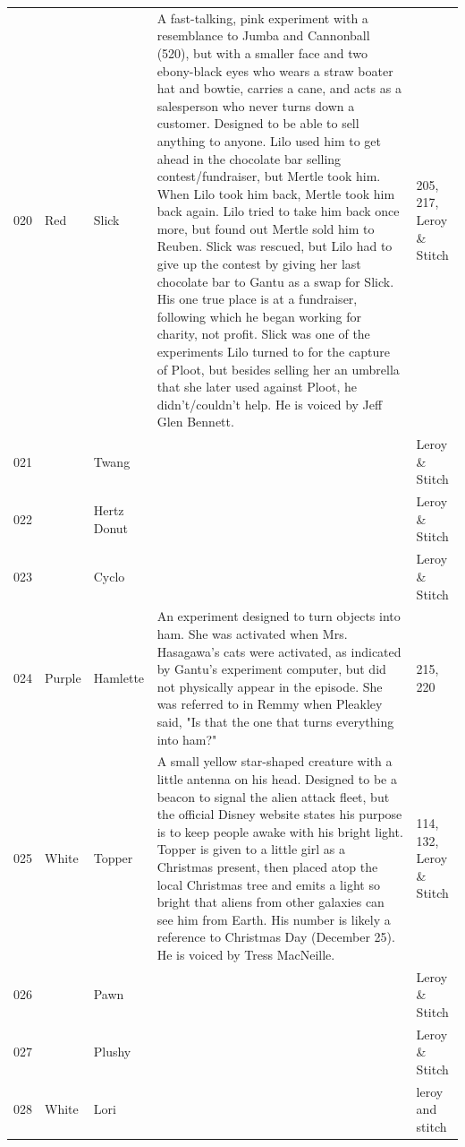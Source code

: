 \documentclass{article}
\begin{document}
\begin{tabular}{lllll}
020 & Red & Slick & A fast-talking, pink experiment with a resemblance to Jumba and Cannonball (520), but with a smaller face and two ebony-black eyes who wears a straw boater hat and bowtie, carries a cane, and acts as a salesperson who never turns down a customer. Designed to be able to sell anything to anyone. Lilo used him to get ahead in the chocolate bar selling contest/fundraiser, but Mertle took him. When Lilo took him back, Mertle took him back again. Lilo tried to take him back once more, but found out Mertle sold him to Reuben. Slick was rescued, but Lilo had to give up the contest by giving her last chocolate bar to Gantu as a swap for Slick. His one true place is at a fundraiser, following which he began working for charity, not profit. Slick was one of the experiments Lilo turned to for the capture of Ploot, but besides selling her an umbrella that she later used against Ploot, he didn't/couldn't help. He is voiced by Jeff Glen Bennett. & 205, 217, Leroy \& Stitch \\
021 &  & Twang &  & Leroy \& Stitch \\
022 &  & Hertz Donut &  & Leroy \& Stitch \\
023 &  & Cyclo &  & Leroy \& Stitch \\
024 & Purple & Hamlette & An experiment designed to turn objects into ham. She was activated when Mrs. Hasagawa's cats were activated, as indicated by Gantu's experiment computer, but did not physically appear in the episode. She was referred to in Remmy when Pleakley said, "Is that the one that turns everything into ham?" & 215, 220 \\
025 & White & Topper & A small yellow star-shaped creature with a little antenna on his head. Designed to be a beacon to signal the alien attack fleet, but the official Disney website states his purpose is to keep people awake with his bright light. Topper is given to a little girl as a Christmas present, then placed atop the local Christmas tree and emits a light so bright that aliens from other galaxies can see him from Earth. His number is likely a reference to Christmas Day (December 25). He is voiced by Tress MacNeille. & 114, 132, Leroy \& Stitch \\
026 &  & Pawn &  & Leroy \& Stitch \\
027 &  & Plushy &  & Leroy \& Stitch \\
028 & White & Lori &  & leroy and stitch \\

\end{tabular}
\end{document}
